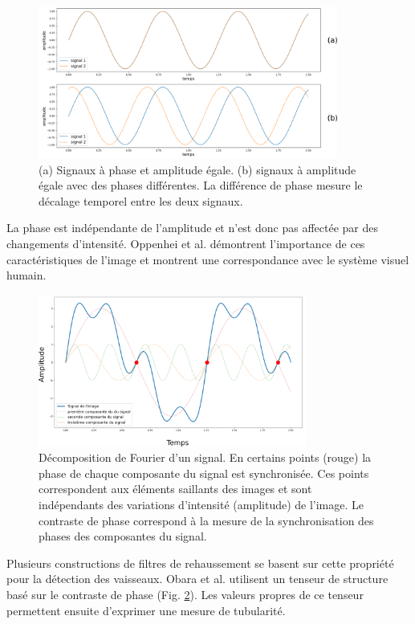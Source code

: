 \begin{figure}[!ht]
  \centering
  \includegraphics[height=5cm]{Images/phase_shift.png}
  \caption{(a) Signaux à phase et amplitude égale. (b) signaux à amplitude égale avec des phases différentes. La différence de phase mesure le décalage temporel entre les deux signaux.}
  \label{fig:phase_shift}
\end{figure}

La phase est indépendante de l'amplitude et n'est donc pas affectée par des changements d'intensité. Oppenhei et al. \cite{Oppenheim1981_phase_importance} démontrent l'importance de ces caractéristiques de l'image et montrent une correspondance avec le système visuel humain. 

\begin{figure}[h]
  \centering
  \includegraphics[height=5cm]{Images/PC_decomposition.png}
  \caption{Décomposition de Fourier d'un signal. En certains points (rouge) la phase de chaque composante du signal est synchronisée. Ces points correspondent aux éléments saillants des images et sont indépendants des variations d'intensité (amplitude) de l'image. Le contraste de phase correspond à la mesure de la synchronisation des phases des composantes du signal.}
  \label{fig:phase_congruency}
\end{figure}

Plusieurs constructions de filtres de rehaussement se basent sur cette propriété pour la détection des vaisseaux. Obara et al. \cite{Obara2012_phase} utilisent un tenseur de structure basé sur le contraste de phase (Fig. \ref{fig:phase_congruency}). Les valeurs propres de ce tenseur permettent ensuite d'exprimer une mesure de tubularité.

